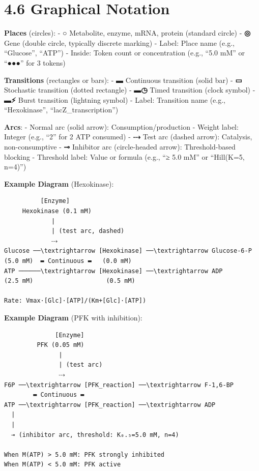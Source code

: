 \hypertarget{graphical-notation}{%
\section{4.6 Graphical Notation}\label{graphical-notation}}

\textbf{Places} (circles): - \textbf{○} Metabolite, enzyme, mRNA,
protein (standard circle) - \textbf{◎} Gene (double circle, typically
discrete marking) - Label: Place name (e.g., ``Glucose'', ``ATP'') -
Inside: Token count or concentration (e.g., ``5.0 mM'' or ``●●●'' for 3
tokens)

\textbf{Transitions} (rectangles or bars): - \textbf{▬} Continuous
transition (solid bar) - \textbf{▭} Stochastic transition (dotted
rectangle) - \textbf{▬◷} Timed transition (clock symbol) - \textbf{▬⚡}
Burst transition (lightning symbol) - Label: Transition name (e.g.,
``Hexokinase'', ``lacZ\_transcription'')

\textbf{Arcs}: - \textbf{\textrightarrow} Normal arc (solid arrow):
Consumption/production - Weight label: Integer (e.g., ``2'' for 2 ATP
consumed) - \textbf{⤏} Test arc (dashed arrow): Catalysis,
non-consumptive - \textbf{⊸} Inhibitor arc (circle-headed arrow):
Threshold-based blocking - Threshold label: Value or formula (e.g., ``≥
5.0 mM'' or ``Hill(K=5, n=4)'')

\textbf{Example Diagram} (Hexokinase):

\begin{lstlisting}
          [Enzyme]
     Hexokinase (0.1 mM)
             |
             | (test arc, dashed)
             ⤏
Glucose ──\textrightarrow [Hexokinase] ──\textrightarrow Glucose-6-P
(5.0 mM)  ▬ Continuous ▬   (0.0 mM)
ATP ──────\textrightarrow [Hexokinase] ──\textrightarrow ADP
(2.5 mM)                    (0.5 mM)

Rate: Vmax·[Glc]·[ATP]/(Km+[Glc]·[ATP])
\end{lstlisting}

\textbf{Example Diagram} (PFK with inhibition):

\begin{lstlisting}
              [Enzyme]
         PFK (0.05 mM)
               |
               | (test arc)
               ⤏
F6P ──\textrightarrow [PFK_reaction] ──\textrightarrow F-1,6-BP
        ▬ Continuous ▬
ATP ──\textrightarrow [PFK_reaction] ──\textrightarrow ADP
  |
  |
  ⊸ (inhibitor arc, threshold: K₀.₅=5.0 mM, n=4)

When M(ATP) > 5.0 mM: PFK strongly inhibited
When M(ATP) < 5.0 mM: PFK active
\end{lstlisting}

